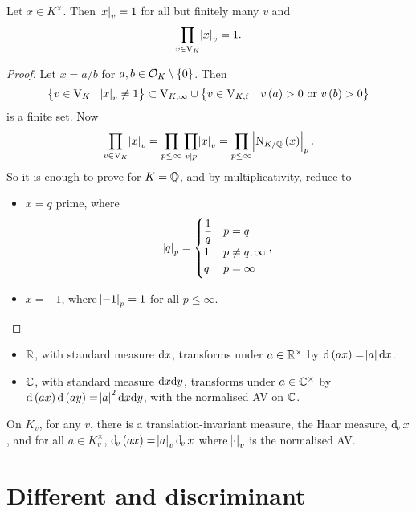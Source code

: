 \begin{theorem}
Let $ x \in K^\times $. Then $ \abs{x}_v = 1 $ for all but finitely many $ v $ and
$$ \prod_{v \in \mathrm{V}_K} \abs{x}_v = 1. $$
\end{theorem}

\begin{proof}
Let $ x = a / b $ for $ a, b \in \OOO_K \setminus \cbr{0} $. Then
$$ \cbr{v \in \V_K \st \abs{x}_v \ne 1} \subset \V_{K, \infty} \cup \cbr{v \in \V_{K, \f} \st v\br{a} > 0 \ \text{or} \ v\br{b} > 0} $$
is a finite set. Now
$$ \prod_{v \in \V_K} \abs{x}_v = \prod_{p \le \infty} \prod_{v \mid p} \abs{x}_v = \prod_{p \le \infty} \abs{\N_{K / \QQ}\br{x}}_p. $$
So it is enough to prove for $ K = \mathbb{Q} $, and by multiplicativity, reduce to
\begin{itemize}
\item $ x = q $ prime, where
$$ \abs{q}_p =
\begin{cases}
\dfrac{1}{q} & p = q \\
1 & p \ne q, \infty \\
q & p = \infty
\end{cases},
$$
\item $ x = -1 $, where $ \abs{-1}_p = 1 $ for all $ p \le \infty $.
\end{itemize}
\end{proof}

\begin{remark*}
\hfill
\begin{itemize}
\item $ \mathbb{R} $, with standard measure $ \mathrm{d} x $, transforms under $ a \in \mathbb{R}^\times $ by $ \d\br{ax} = \abs{a}\d x $.
\item $ \mathbb{C} $, with standard measure $ \mathrm{d} x\mathrm{d} y $, transforms under $ a \in \mathbb{C}^\times $ by $ \d\br{ax}\d\br{ay} = \abs{a}^2\d x\d y $, with the normalised AV on $ \mathbb{C} $.
\end{itemize}
\end{remark*}

\begin{fact*}
On $ K_v $, for any $ v $, there is a translation-invariant measure, the Haar measure, $ \dv x $, and for all $ a \in K_v^\times $, $ \dv\br{ax} = \abs{a}_v\dv x $ where $ \abs{\cdot}_v $ is the normalised AV.
\end{fact*}

\pagebreak

\section{Different and discriminant}

